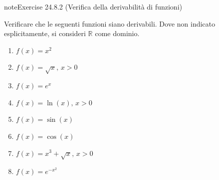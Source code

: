 \documentclass[letterpaper,10pt,italian]{jupyterBook}
\begin{document}
\begin{sphinxadmonition}{note}{Exercise 24.8.2 (Verifica della derivabilità di funzioni)}



\sphinxAtStartPar
Verificare che le seguenti funzioni siano derivabili. Dove non indicato esplicitamente, si consideri \(\mathbb{R}\) come dominio.
\begin{enumerate}
%
\item {} 
\sphinxAtStartPar
\(f(x) = x^2\)

\item {} 
\sphinxAtStartPar
\(f(x) = \sqrt{x}, \, x > 0\)

\item {} 
\sphinxAtStartPar
\(f(x) = e^x\)

\item {} 
\sphinxAtStartPar
\(f(x) = \ln(x), \, x > 0\)

\item {} 
\sphinxAtStartPar
\(f(x) = \sin(x)\)

\item {} 
\sphinxAtStartPar
\(f(x) = \cos(x)\)

\item {} 
\sphinxAtStartPar
\(f(x) = x^3 + \sqrt{x}, \, x > 0\)

\item {} 
\sphinxAtStartPar
\(f(x) = e^{-x^2}\)

\end{enumerate}

\sphinxAtStartPar
{}
\end{sphinxadmonition}
 \label{exercise:ch/infinitesimal_calculus/derivatives-problems-exercise-2}
\end{document}

